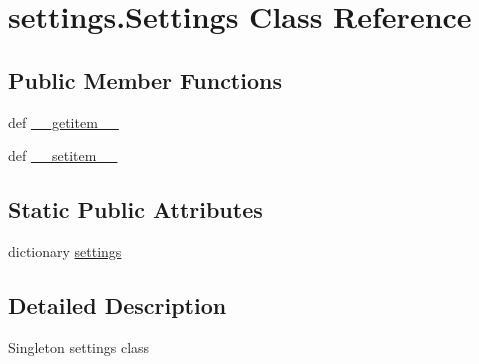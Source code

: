 \hypertarget{classsettings_1_1_settings}{\section{settings.\-Settings \-Class \-Reference}
\label{classsettings_1_1_settings}
}
\subsection*{\-Public \-Member \-Functions}
\begin{DoxyCompactItemize}
\item 
def \hyperlink{classsettings_1_1_settings_a16ab410bb2864df7a2fe2bcb8561b087}{\-\_\-\-\_\-getitem\-\_\-\-\_\-}
\item 
def \hyperlink{classsettings_1_1_settings_ae676974ed795f19d271e93d942743edd}{\-\_\-\-\_\-setitem\-\_\-\-\_\-}
\end{DoxyCompactItemize}
\subsection*{\-Static \-Public \-Attributes}
\begin{DoxyCompactItemize}
\item 
dictionary \hyperlink{classsettings_1_1_settings_abe88b4a55388b7083a64a5401f0a4ac9}{settings}
\end{DoxyCompactItemize}


\subsection{\-Detailed \-Description}
\begin{DoxyVerb}Singleton settings class\end{DoxyVerb}
 

